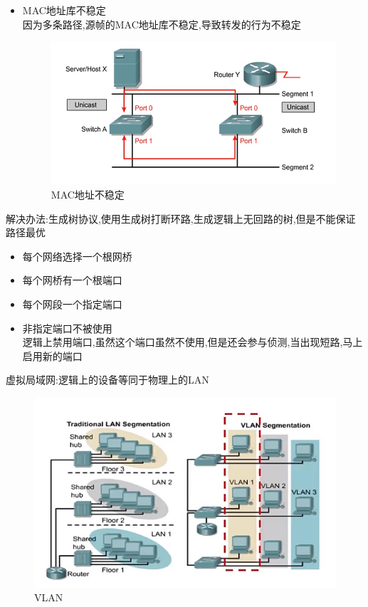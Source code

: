 \documentclass[UTF8,a4paper]{ctexart}
\begin{document}
\begin{itemize}
  \item MAC地址库不稳定\\
  因为多条路径,源帧的MAC地址库不稳定,导致转发的行为不稳定
  \begin{figure}[H]
    \centering
    \includegraphics{assets/jisuanjiwangluo_a3aec.png}
    \caption{MAC地址不稳定}
  \end{figure}
\end{itemize}

解决办法:生成树协议,使用生成树打断环路,生成逻辑上无回路的树,但是不能保证路径最优
\begin{itemize}
  \item 每个网络选择一个根网桥
  \item 每个网桥有一个根端口
  \item 每个网段一个指定端口
  \item 非指定端口不被使用\\
  逻辑上禁用端口,虽然这个端口虽然不使用,但是还会参与侦测,当出现短路,马上启用新的端口
\end{itemize}

虚拟局域网:逻辑上的设备等同于物理上的LAN
\begin{figure}[H]
  \centering
  \includegraphics{assets/jisuanjiwangluo_00769.png}
  \caption{VLAN}
\end{figure}
\end{document}
